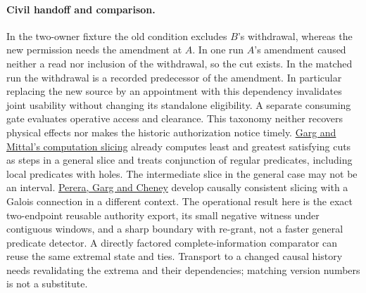 \documentclass{article}
\begin{document}
\paragraph{Civil handoff and comparison.}
In the two-owner fixture the old condition excludes \(B\)'s withdrawal, whereas the new permission needs the amendment at \(A\). In one run \(A\)'s amendment caused neither a read nor inclusion of the withdrawal, so the cut exists. In the matched run the withdrawal is a recorded predecessor of the amendment. In particular replacing the new source by an appointment with this dependency invalidates joint usability without changing its standalone eligibility. A separate consuming gate evaluates operative access and clearance. This taxonomy neither recovers physical effects nor makes the historic authorization notice timely.
\href{https://users.ece.utexas.edu/~garg/dist/dcs01-slice.pdf}{Garg and Mittal's computation slicing} already computes least and greatest satisfying cuts as steps in a general slice and treats conjunction of regular predicates, including local predicates with holes. The intermediate slice in the general case may not be an interval. \href{https://arxiv.org/abs/1610.02327}{Perera, Garg and Cheney} develop causally consistent slicing with a Galois connection in a different context. The operational result here is the exact two-endpoint reusable authority export, its small negative witness under contiguous windows, and a sharp boundary with re-grant, not a faster general predicate detector. A directly factored complete-information comparator can reuse the same extremal state and ties. Transport to a changed causal history needs revalidating the extrema and their dependencies; matching version numbers is not a substitute.
\end{document}
